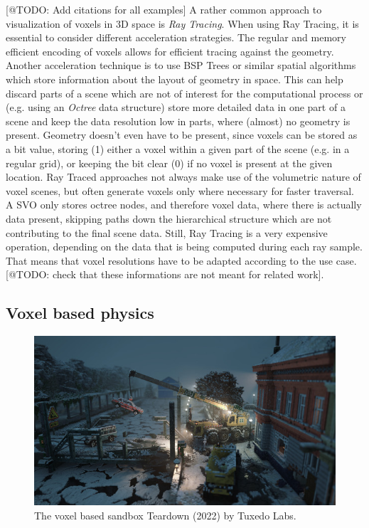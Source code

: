 [@TODO: Add citations for all examples]
A rather common approach to visualization of voxels in 3D space is \emph{Ray Tracing}. When using 
Ray Tracing, it is essential to consider different acceleration strategies. The regular 
and memory efficient encoding of voxels allows for efficient tracing against the geometry. 
Another acceleration technique is to use \ac{BSP} Trees or similar spatial algorithms which store 
information about the layout of geometry in space. This can help discard parts of a scene which are 
not of interest for the computational process or (e.g. using an \emph{Octree} data structure) store 
more detailed data in one part of a scene and keep the data resolution low in parts, where (almost) 
no geometry is present. Geometry doesn't even have to be present, since voxels can be stored 
as a bit value, storing (1) either a voxel within a given part of the scene (e.g. in a regular grid),
or keeping the bit clear (0) if no voxel is present at the given location. 
Ray Traced approaches not always make use of the volumetric nature of voxel scenes, but often generate 
voxels only where necessary for faster traversal. A \ac{SVO} only stores octree nodes, and therefore voxel 
data, where there is actually data present, skipping paths down the hierarchical structure which are not 
contributing to the final scene data. Still, Ray Tracing is a very expensive operation, depending on the 
data that is being computed during each ray sample. That means that voxel resolutions have to be adapted 
according to the use case. [@TODO: check that these informations are not meant for related work].

\subsection{Voxel based physics}

\begin{figure}[h]
    \centering
    \includegraphics[width=\linewidth]{images/graphics/teardown.jpg}
    \caption{The voxel based sandbox Teardown (2022) by Tuxedo Labs.}
    \label{fig:teardown}
\end{figure}

